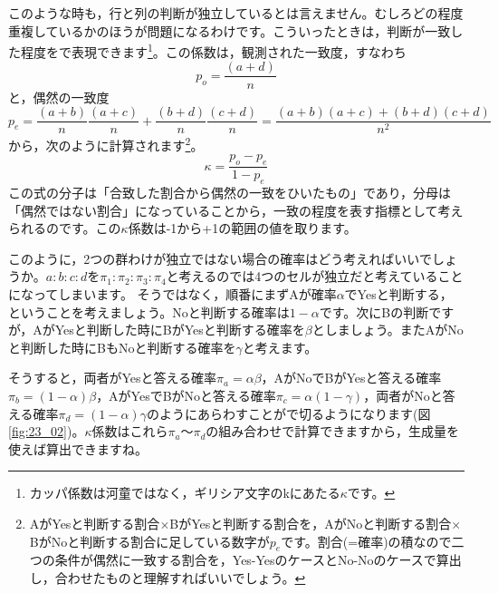 \documentclass{ltjsbook}
\begin{document}
このような時も，行と列の判断が独立しているとは言えません。むしろどの程度重複しているかのほうが問題になるわけです。こういったときは，判断が一致した程度をで表現できます\footnote{カッパ係数は河童ではなく，ギリシア文字のkにあたる$\kappa$です。}。この係数は，観測された一致度，すなわち
\[ p_o = \frac{( a + d )}{n} \]
と，偶然の一致度
\[ p_e = \frac{(a+b)}{n}\frac{(a+c)}{n} + \frac{(b+d)}{n}\frac{(c+d)}{n} = \frac{(a+b)(a+c)+(b+d)(c+d)}{n^2} \]
から，次のように計算されます\footnote{AがYesと判断する割合$\times$BがYesと判断する割合を，AがNoと判断する割合$\times$BがNoと判断する割合に足している数字が$p_e$です。割合(=確率)の積なので二つの条件が偶然に一致する割合を，Yes-YesのケースとNo-Noのケースで算出し，合わせたものと理解すればいいでしょう。}。
\[ \kappa = \frac{p_o-p_e}{1-p_e } \]
この式の分子は「合致した割合から偶然の一致をひいたもの」であり，分母は「偶然ではない割合」になっていることから，一致の程度を表す指標として考えられるのです。この$\kappa$係数は-1から+1の範囲の値を取ります。


このように，2つの群わけが独立ではない場合の確率はどう考えればいいでしょうか。$a:b:c:d$を$\pi_1:\pi_2:\pi_3:\pi_4$と考えるのでは4つのセルが独立だと考えていることになってしまいます。
そうではなく，順番にまずAが確率$\alpha$でYesと判断する，ということを考えましょう。Noと判断する確率は$1-\alpha$です。次にBの判断ですが，AがYesと判断した時にBがYesと判断する確率を$\beta$としましょう。またAがNoと判断した時にBもNoと判断する確率を$\gamma$と考えます。

そうすると，両者がYesと答える確率$\pi_a = \alpha\beta$，AがNoでBがYesと答える確率$\pi_b = (1-\alpha)\beta$，AがYesでBがNoと答える確率$\pi_c = \alpha(1-\gamma)$，両者がNoと答える確率$\pi_d = (1-\alpha)\gamma $のようにあらわすことがで切るようになります(図\ref{fig:23_02})。$\kappa$係数はこれら$\pi_a$〜$\pi_d$の組み合わせで計算できますから，生成量を使えば算出できますね。
\end{document}
